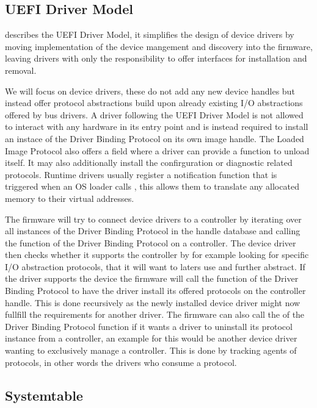 \subsection{\acs{UEFI} Driver Model}

\cite[Section 2.5.2]{uefi-spec} describes the \acs{UEFI} Driver Model, it simplifies the design of device drivers by moving implementation of the device mangement and discovery into the firmware, leaving drivers with only the responsibility to offer interfaces for installation and removal.

We will focus on device drivers, these do not add any new device handles but instead offer protocol abstractions build upon already existing \ac{I/O} abstractions offered by bus drivers.
A driver following the \ac{UEFI} Driver Model is not allowed to interact with any hardware in its entry point and is instead required to install an instace of the Driver Binding Protocol on its own image handle.
The Loaded Image Protocol also offers a field where a driver can provide a function to unload itself.
It may also additionally install the confirguration or diagnostic related protocols.
Runtime drivers usually register a notification function that is triggered when an \ac{OS} loader calls , this allows them to translate any allocated memory to their virtual addresses.

The firmware will try to connect device drivers to a controller by iterating over all instances of the Driver Binding Protocol in the handle database and calling the  function of the Driver Binding Protocol on a controller. The device driver then checks whether it supports the controller by for example looking for specific \ac{I/O} abstraction protocols, that it will want to laters use and further abstract.
If the driver supports the device the firmware will call the  function of the Driver Binding Protocol to have the driver install its offered protocols on the controller handle.
This is done recursively as the newly installed device driver might now fullfill the requirements for another driver.
The firmware can also call the  of the Driver Binding Protocol function if it wants a driver to uninstall its protocol instance from a controller, an example for this would be another device driver wanting to exclusively manage a controller. This is done by tracking agents of protocols, in other words the drivers who consume a protocol.

\subsection{Systemtable}

